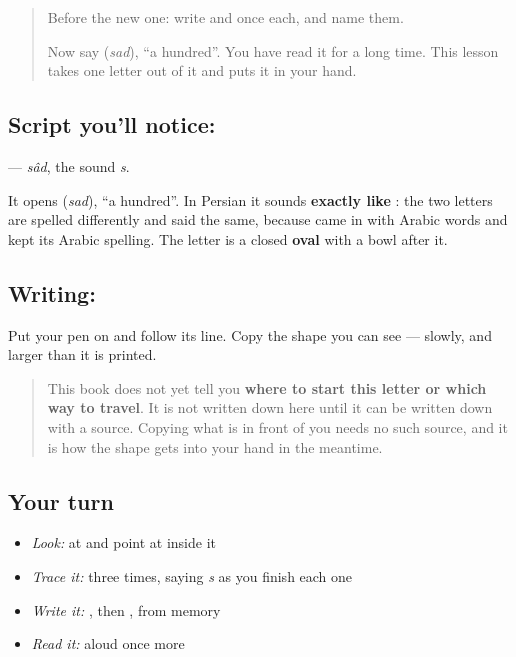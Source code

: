 \begin{quote}
Before the new one: write  and  once each, and name them.

Now say \textbf{} (\emph{sad}), \textquotedblleft{}a hundred\textquotedblright{}. You have read it for a long time. This lesson takes one letter out of it and puts it in your hand.
\end{quote}

\subsection*{Script you'll notice: }
\textbf{} — \emph{sâd}, the sound \emph{s}.

It opens \textbf{} (\emph{sad}), \textquotedblleft{}a hundred\textquotedblright{}. In Persian it sounds \textbf{exactly like }: the two letters are spelled differently and said the same, because \textbf{} came in with Arabic words and kept its Arabic spelling. The letter is a closed \textbf{oval} with a bowl after it.

\subsection*{Writing: }
Put your pen on  and follow its line. Copy the shape you can see — slowly, and larger than it is printed.

\begin{quote}
This book does not yet tell you \textbf{where to start this letter or which way to travel}. It is not written down here until it can be written down with a source. Copying what is in front of you needs no such source, and it is how the shape gets into your hand in the meantime.
\end{quote}

\subsection*{Your turn}
\begin{itemize}
\raggedright
  \item \emph{Look:} at \textbf{} and point at  inside it
  \item \emph{Trace it:}  three times, saying \emph{s} as you finish each one
  \item \emph{Write it:} , then , from memory
  \item \emph{Read it:} \textbf{} aloud once more
\end{itemize}

